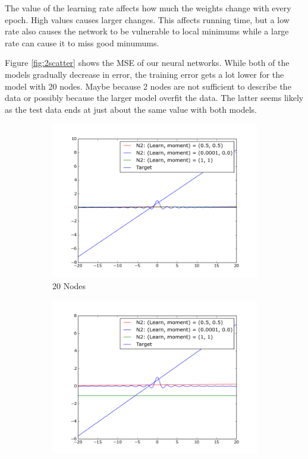 \documentclass{article}
\begin{document}
The value of the learning rate affects how much the weights change with
every epoch. High values causes larger changes. This affects running time,
but a low rate also causes the network to be vulnerable to local minimums
while a large rate can cause it to miss good minumums.

Figure \ref{fig:2scatter} shows the MSE of our neural networks. While
both of the models gradually decrease in error, the training error gets
a lot lower for the model with 20 nodes. Maybe because 2 nodes are not
sufficient to describe the data or possibly because the larger model
overfit the data. The latter seems likely as the test data ends at just
about the same value with both models.

\begin{figure}
    \centering
    \begin{subfigure}[b]{0.49\textwidth}
        \includegraphics[width=1.0\textwidth]{Part1/20NSinc.png}
        \caption{20 Nodes}
        \label{fig:plot2}
    \end{subfigure}
    \begin{subfigure}[b]{0.49\textwidth}
        \includegraphics[width=1.0\textwidth]{Part1/2NSinc.png}

\end{subfigure}
\end{figure}
\end{document}
